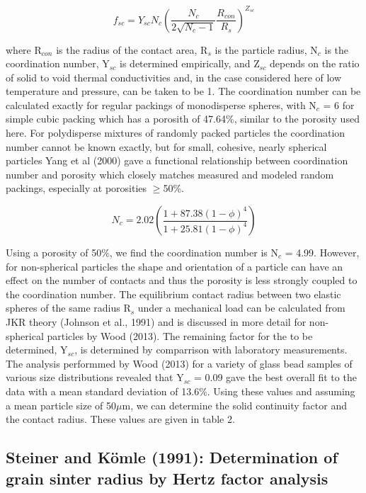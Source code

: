 \documentclass[11pt]{article} %
\begin{document}
	\begin{equation}
	f_{sc} = Y_{sc}N_{c} \left( \frac{N_{c}}{2\sqrt{N_{c}-1}} \frac{R_{con}}{R_{s}} \right)^{Z_{sc}}
	\end{equation}
	
	where R$_{con}$ is the radius of the contact area, R$_{s}$ is the particle radius, N$_{c}$ is the coordination number, Y$_{sc}$ is determined empirically, and Z$_{sc}$ depends on the ratio of solid to void thermal conductivities and, in the case considered here of low temperature and pressure, can be taken to be 1. The coordination number can be calculated exactly for regular packings of monodisperse spheres, with N$_{c}$ = 6 for simple cubic packing which has a porosith of 47.64\%, similar to the porosity used here. For polydisperse mixtures of randomly packed particles the coordination number cannot be known exactly, but for small, cohesive, nearly spherical particles Yang et al (2000) gave a functional relationship between coordination number and porosity which closely matches measured and modeled random packings, especially at porosities $\ge$50\%. 
	
	\begin{equation}
	N_{c} = 2.02 \left( \frac{1+87.38(1-\phi)^{4}}{1+25.81(1-\phi)^{4}} \right)
	\end{equation}
	
	Using a porosity of 50\%, we find the coordination number is N$_{c}$ = 4.99. However, for non-spherical particles the shape and orientation of a particle can have an effect on the number of contacts and thus the porosity is less strongly coupled to the coordination number. The equilibrium contact radius between two elastic spheres of the same radius R$_{s}$ under a mechanical load can be calculated from JKR theory (Johnson et al., 1991) and is discussed in more detail for non-spherical particles by Wood (2013). The remaining factor for the to be determined, Y$_{sc}$, is determined by comparrison with laboratory measurements. The analysis performmed by Wood (2013) for a variety of glass bead samples of various size distributions revealed that Y$_{sc}$ = 0.09 gave the best overall fit to the data with a mean standard deviation of 13.6\%. Using these values and assuming a mean particle size of 50$\mu$m, we can determine the solid continuity factor and the contact radius. These values are given in table 2. 
	
\subsection{Steiner and K\"{o}mle (1991): Determination of grain sinter radius by Hertz factor analysis}
\end{document}
